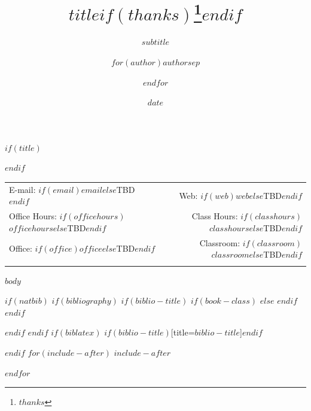 \documentclass[$if(fontsize)$$fontsize$,$endif$$if(lang)$$babel-lang$,$endif$$if(papersize)$$papersize$,$endif$$for(classoption)$$classoption$$sep$,$endfor$]{article}
\title{$title$$if(thanks)$\thanks{$thanks$}$endif$}
\subtitle{$subtitle$}
\author{$for(author)$$author$$sep$ \and $endfor$}
\date{$date$}
\begin{document}
  
  

	$if(title)$
	\maketitle
	$endif$
	
	
		\thispagestyle{firststyle}



	\noindent \begin{tabular*}{\textwidth}{ @{\extracolsep{\fill}} lr @{\extracolsep{\fill}}}


E-mail: $if(email)$\texttt{$email$}$else$TBD$endif$ & Web: $if(web)$\href{http://$web$}{\tt $web$}$else$TBD$endif$\\
Office Hours: $if(officehours)$$officehours$$else$TBD$endif$  &  Class Hours: $if(classhours)$$classhours$$else$TBD$endif$\\
Office: $if(office)$$office$$else$TBD$endif$  & Classroom: $if(classroom)$$classroom$$else$TBD$endif$\\
	&  \\
	\hline
	\end{tabular*}
	
\vspace{2mm}
	


$body$




$if(natbib)$
$if(bibliography)$
$if(biblio-title)$
$if(book-class)$
\renewcommand\bibname{$biblio-title$}
$else$
\renewcommand\refname{$biblio-title$}
$endif$
$endif$


$endif$
$endif$
$if(biblatex)$
\printbibliography$if(biblio-title)$[title=$biblio-title$]$endif$




$endif$
$for(include-after)$
$include-after$

$endfor$
\end{document}
